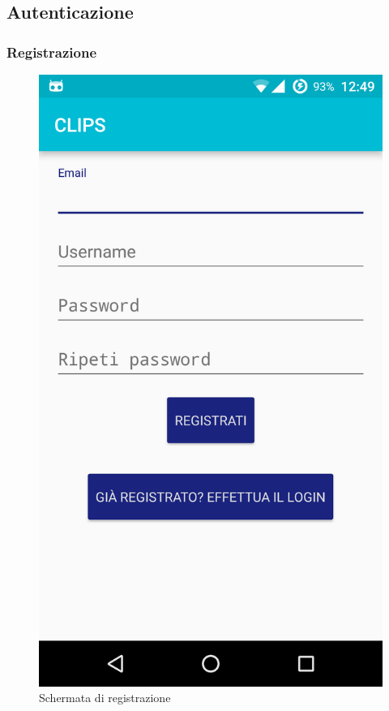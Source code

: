 \subsection{Autenticazione} 
\subsubsection{Registrazione}

\begin{figure}[!h]
	\centering
	\includegraphics[scale=0.15]{screenshot/Registrazione}
	\caption{Schermata di registrazione}
\end{figure}


